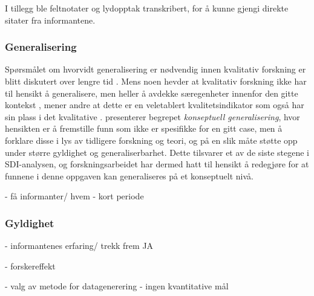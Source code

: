 I tillegg ble feltnotater og lydopptak transkribert, for å kunne gjengi direkte sitater fra informantene.



\subsubsection{Generalisering}
Spørsmålet om hvorvidt generalisering er nødvendig innen kvalitativ forskning er blitt diskutert over lengre tid \citep{Tjora}. Mens noen hevder at kvalitativ forskning ikke har til hensikt å generalisere, men heller å avdekke særegenheter innenfor den gitte kontekst \citep{Creswell, Oates}, mener andre at dette er en veletablert kvalitetsindikator som også har sin plass i det kvalitative \citep{Tjora}. \citet{Tjora} presenterer begrepet \textit{konseptuell generalisering}, hvor hensikten er å fremstille funn som ikke er spesifikke for en gitt case, men å forklare disse i lys av tidligere forskning og teori, og på en slik måte støtte opp under større gyldighet og generaliserbarhet. Dette tilsvarer et av de siste stegene i SDI-analysen, og forskningsarbeidet har dermed hatt til hensikt å redegjøre for at funnene i denne oppgaven kan generaliseres på et konseptuelt nivå. 

- få informanter/ hvem
- kort periode 

\subsubsection{Gyldighet}
- informantenes erfaring/ trekk frem JA

- forskereffekt

- valg av metode for datagenerering
	- ingen kvantitative mål